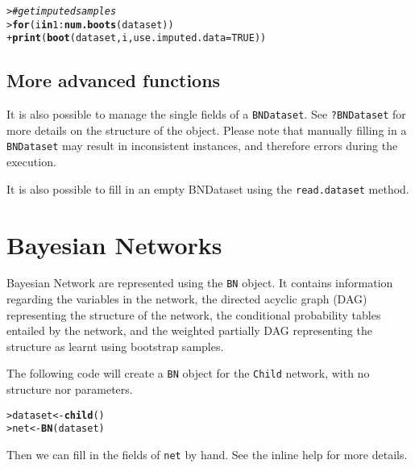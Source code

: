 \documentclass{article}\usepackage[]{graphicx}\usepackage[]{color}
\makeatletter
\newcommand{\hlnum}[1]{\textcolor[rgb]{0.686,0.059,0.569}{#1}}%
\newcommand{\hlcom}[1]{\textcolor[rgb]{0.678,0.584,0.686}{\textit{#1}}}%
\newcommand{\hlopt}[1]{\textcolor[rgb]{0,0,0}{#1}}%
\newcommand{\hlstd}[1]{\textcolor[rgb]{0.345,0.345,0.345}{#1}}%
\newcommand{\hlkwa}[1]{\textcolor[rgb]{0.161,0.373,0.58}{\textbf{#1}}}%
\newcommand{\hlkwb}[1]{\textcolor[rgb]{0.69,0.353,0.396}{#1}}%
\newcommand{\hlkwc}[1]{\textcolor[rgb]{0.333,0.667,0.333}{#1}}%
\newcommand{\hlkwd}[1]{\textcolor[rgb]{0.737,0.353,0.396}{\textbf{#1}}}%
\newenvironment{kframe}{%
 \def\at@end@of@kframe{}%
 \ifinner\ifhmode%
  \def\at@end@of@kframe{\end{minipage}}%
  \begin{minipage}{\columnwidth}%
 \fi\fi%
 \def\FrameCommand##1{\hskip\@totalleftmargin \hskip-\fboxsep
 \colorbox{shadecolor}{##1}\hskip-\fboxsep
     \hskip-\linewidth \hskip-\@totalleftmargin \hskip\columnwidth}%
 \MakeFramed {\advance\hsize-\width
   \@totalleftmargin\z@ \linewidth\hsize
   \@setminipage}}%
 {\par\unskip\endMakeFramed%
 \at@end@of@kframe}
\newenvironment{knitrout}{}{} %
\newcommand{\Robject}[1]{{\texttt{#1}}}
\newcommand{\Rmethod}[1]{{\texttt{#1}}}
\makeatother
\begin{document}
\begin{knitrout}
\color{fgcolor}\begin{kframe}
\begin{alltt}
\hlstd{> }\hlcom{# get imputed samples}
\hlstd{> }\hlkwa{for} \hlstd{(i} \hlkwa{in} \hlnum{1}\hlopt{:}\hlkwd{num.boots}\hlstd{(dataset))}
\hlstd{+ }  \hlkwd{print}\hlstd{(} \hlkwd{boot}\hlstd{(dataset, i,} \hlkwc{use.imputed.data} \hlstd{=} \hlnum{TRUE}\hlstd{) )}
\end{alltt}
\end{kframe}
\end{knitrout}

\subsection{More advanced functions}
It is also possible to manage the single fields of a \Robject{BNDataset}. See \texttt{?BNDataset}
for more details on the structure of the object. Please note that manually filling in a \Robject{BNDataset}
may result in inconsistent instances, and therefore errors during the execution.

It is also possible to fill in an empty BNDataset using the \Rmethod{read.dataset} method.

\section{Bayesian Networks}
Bayesian Network are represented using the \Robject{BN} object. It contains information regarding the variables in the network,
the directed acyclic graph (DAG) representing the structure of the network, the conditional probability tables entailed by 
the network, and the weighted partially DAG representing the structure as learnt using bootstrap samples.

The following code will create a \Robject{BN} object for the \texttt{Child} network, with no structure nor parameters.
\begin{knitrout}
\color{fgcolor}\begin{kframe}
\begin{alltt}
\hlstd{> }\hlstd{dataset} \hlkwb{<-} \hlkwd{child}\hlstd{()}
\hlstd{> }\hlstd{net}     \hlkwb{<-} \hlkwd{BN}\hlstd{(dataset)}
\end{alltt}
\end{kframe}
\end{knitrout}
Then we can fill in the fields of \Rmethod{net} by hand. See the inline help for more details.
\end{document}
